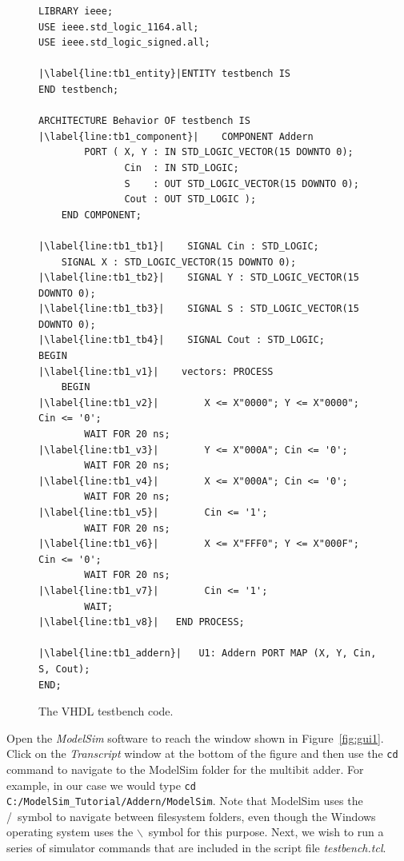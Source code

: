 \documentclass[11pt, twoside, pdftex]{article}
\begin{document}
\lstset{language=VHDL,numbers=left,escapechar=|}
\begin{figure}[h!]
\begin{center}
\begin{minipage}[t]{15 cm}
\begin{lstlisting}[name=testbench]
LIBRARY ieee;                                               
USE ieee.std_logic_1164.all;                                
USE ieee.std_logic_signed.all;

|\label{line:tb1_entity}|ENTITY testbench IS
END testbench;

ARCHITECTURE Behavior OF testbench IS
|\label{line:tb1_component}|    COMPONENT Addern
        PORT ( X, Y : IN STD_LOGIC_VECTOR(15 DOWNTO 0);
               Cin  : IN STD_LOGIC;
               S    : OUT STD_LOGIC_VECTOR(15 DOWNTO 0);
               Cout : OUT STD_LOGIC );
    END COMPONENT;

|\label{line:tb1_tb1}|    SIGNAL Cin : STD_LOGIC;
    SIGNAL X : STD_LOGIC_VECTOR(15 DOWNTO 0);
|\label{line:tb1_tb2}|    SIGNAL Y : STD_LOGIC_VECTOR(15 DOWNTO 0);
|\label{line:tb1_tb3}|    SIGNAL S : STD_LOGIC_VECTOR(15 DOWNTO 0);
|\label{line:tb1_tb4}|    SIGNAL Cout : STD_LOGIC;
BEGIN
|\label{line:tb1_v1}|    vectors: PROCESS           
    BEGIN
|\label{line:tb1_v2}|        X <= X"0000"; Y <= X"0000"; Cin <= '0';
        WAIT FOR 20 ns;
|\label{line:tb1_v3}|        Y <= X"000A"; Cin <= '0';
        WAIT FOR 20 ns;
|\label{line:tb1_v4}|        X <= X"000A"; Cin <= '0';
        WAIT FOR 20 ns;
|\label{line:tb1_v5}|        Cin <= '1';
        WAIT FOR 20 ns;
|\label{line:tb1_v6}|        X <= X"FFF0"; Y <= X"000F"; Cin <= '0';
        WAIT FOR 20 ns;
|\label{line:tb1_v7}|        Cin <= '1';
        WAIT;
|\label{line:tb1_v8}|   END PROCESS;                                          

|\label{line:tb1_addern}|   U1: Addern PORT MAP (X, Y, Cin, S, Cout);
END;
\end{lstlisting}
\end{minipage}
\caption{The VHDL testbench code.}
\label{fig:tb1}
\end{center}
\end{figure}

\noindent
Open the {\it ModelSim} software to reach the window shown in Figure~\ref{fig:gui1}.
Click on the {\it Transcript} window at the bottom of the figure and then use the
\texttt{cd} command to navigate to the ModelSim folder for the multibit adder. For 
example, in our case we would type \texttt{cd C:/ModelSim\_Tutorial/Addern/ModelSim}. 
Note that ModelSim uses the /~symbol to navigate between filesystem folders, even though 
the Windows operating system uses the $\backslash$~symbol for this purpose.
Next, we wish to run a series of simulator commands that are included in the script file
{\it testbench.tcl}. 
\end{document}
